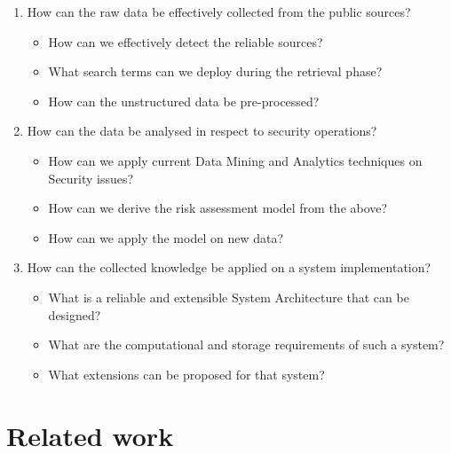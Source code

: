 \documentclass[12pt]{article}
\begin{document}
\begin{enumerate}
	\item How can the raw data be effectively collected from the public sources? 
	\begin{itemize}
		\item How can we effectively detect the reliable sources?
		\item What search terms can we deploy during the retrieval phase?
		\item How can the unstructured data be pre-processed? 
	\end{itemize}
	\item How can the data be analysed in respect to security operations?
	\begin{itemize}
		\item How can we apply current Data Mining and Analytics techniques on Security issues?
		\item How can we derive the risk assessment model from the above?
		\item How can we apply the model on new data?
	\end{itemize}
	\item	How can the collected knowledge be applied on a system implementation?
	\begin{itemize}
		\item What is a reliable and extensible System Architecture that can be designed?
		\item What are the computational and storage requirements of such a system?
		\item What extensions can be proposed for that system?
	\end{itemize}
\end{enumerate}





\section{Related work}
\end{document}
